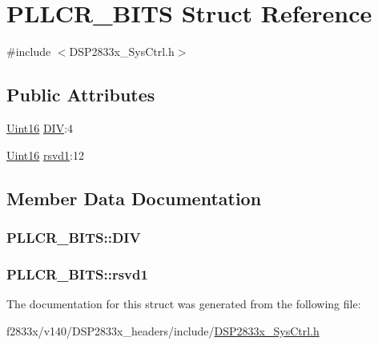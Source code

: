 \hypertarget{struct_p_l_l_c_r___b_i_t_s}{}\section{P\+L\+L\+C\+R\+\_\+\+B\+I\+T\+S Struct Reference}
\label{struct_p_l_l_c_r___b_i_t_s}


{\ttfamily \#include $<$D\+S\+P2833x\+\_\+\+Sys\+Ctrl.\+h$>$}

\subsection*{Public Attributes}
\begin{DoxyCompactItemize}
\item 
\hyperlink{_d_s_p2833x___device_8h_a59a9f6be4562c327cbfb4f7e8e18f08b}{Uint16} \hyperlink{struct_p_l_l_c_r___b_i_t_s_ac084b5f9630ba377da1b825a52557d5f}{D\+I\+V}\+:4
\item 
\hyperlink{_d_s_p2833x___device_8h_a59a9f6be4562c327cbfb4f7e8e18f08b}{Uint16} \hyperlink{struct_p_l_l_c_r___b_i_t_s_ad08b3a787027d6e6c143788a1c63a4eb}{rsvd1}\+:12
\end{DoxyCompactItemize}


\subsection{Member Data Documentation}
\hypertarget{struct_p_l_l_c_r___b_i_t_s_ac084b5f9630ba377da1b825a52557d5f}{}
\subsubsection[{D\+I\+V}]{ P\+L\+L\+C\+R\+\_\+\+B\+I\+T\+S\+::\+D\+I\+V}\label{struct_p_l_l_c_r___b_i_t_s_ac084b5f9630ba377da1b825a52557d5f}
\hypertarget{struct_p_l_l_c_r___b_i_t_s_ad08b3a787027d6e6c143788a1c63a4eb}{}
\subsubsection[{rsvd1}]{ P\+L\+L\+C\+R\+\_\+\+B\+I\+T\+S\+::rsvd1}\label{struct_p_l_l_c_r___b_i_t_s_ad08b3a787027d6e6c143788a1c63a4eb}


The documentation for this struct was generated from the following file\+:\begin{DoxyCompactItemize}
\item 
f2833x/v140/\+D\+S\+P2833x\+\_\+headers/include/\hyperlink{_d_s_p2833x___sys_ctrl_8h}{D\+S\+P2833x\+\_\+\+Sys\+Ctrl.\+h}\end{DoxyCompactItemize}
